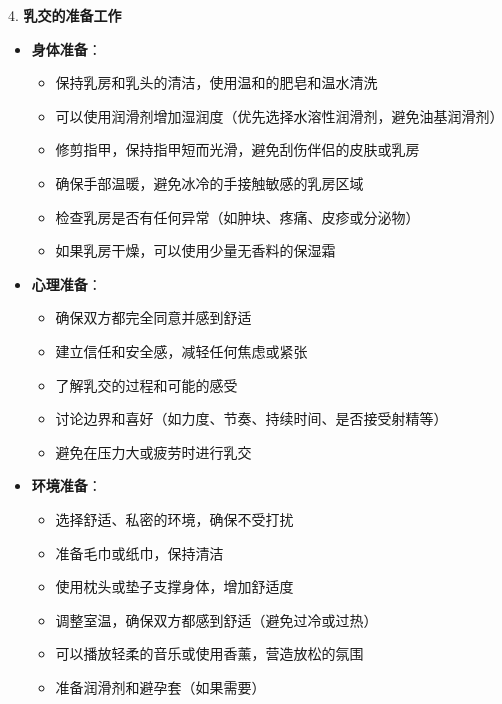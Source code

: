 \documentclass[12pt,UTF8]{ctexbook}
\begin{document}
4. \textbf{乳交的准备工作}
\begin{itemize}
	\item \textbf{身体准备}：
	\begin{itemize}
		\item 保持乳房和乳头的清洁，使用温和的肥皂和温水清洗
		\item 可以使用润滑剂增加湿润度（优先选择水溶性润滑剂，避免油基润滑剂）
		\item 修剪指甲，保持指甲短而光滑，避免刮伤伴侣的皮肤或乳房
		\item 确保手部温暖，避免冰冷的手接触敏感的乳房区域
		\item 检查乳房是否有任何异常（如肿块、疼痛、皮疹或分泌物）
		\item 如果乳房干燥，可以使用少量无香料的保湿霜
	\end{itemize}
	\item \textbf{心理准备}：
	\begin{itemize}
		\item 确保双方都完全同意并感到舒适
		\item 建立信任和安全感，减轻任何焦虑或紧张
		\item 了解乳交的过程和可能的感受
		\item 讨论边界和喜好（如力度、节奏、持续时间、是否接受射精等）
		\item 避免在压力大或疲劳时进行乳交
	\end{itemize}
	\item \textbf{环境准备}：
	\begin{itemize}
		\item 选择舒适、私密的环境，确保不受打扰
		\item 准备毛巾或纸巾，保持清洁
		\item 使用枕头或垫子支撑身体，增加舒适度
		\item 调整室温，确保双方都感到舒适（避免过冷或过热）
		\item 可以播放轻柔的音乐或使用香薰，营造放松的氛围
		\item 准备润滑剂和避孕套（如果需要）
	\end{itemize}
\end{itemize}
\end{document}
